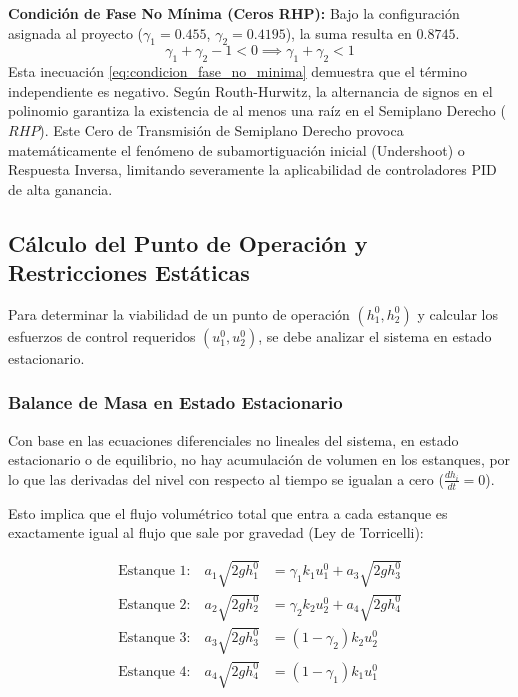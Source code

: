 \textbf{Condición de Fase No Mínima (Ceros RHP):}
Bajo la configuración asignada al proyecto ($\gamma_1 = 0.455$, $\gamma_2 = 0.4195$), la suma resulta en $0.8745$.
\begin{equation}
\gamma_1 + \gamma_2 - 1 < 0 \implies \gamma_1 + \gamma_2 < 1
\label{eq:condicion_fase_no_minima}
\end{equation}
Esta inecuación \eqref{eq:condicion_fase_no_minima} demuestra que el término independiente es negativo. Según Routh-Hurwitz, la alternancia de signos en el polinomio garantiza la existencia de al menos una raíz en el Semiplano Derecho ($RHP$). Este Cero de Transmisión de Semiplano Derecho provoca matemáticamente el fenómeno de subamortiguación inicial (Undershoot) o Respuesta Inversa, limitando severamente la aplicabilidad de controladores PID de alta ganancia.
\clearpage
\subsection{Cálculo del Punto de Operación y Restricciones Estáticas}

Para determinar la viabilidad de un punto de operación $(h_1^0, h_2^0)$ y calcular los esfuerzos de control requeridos $(u_1^0, u_2^0)$, se debe analizar el sistema en estado estacionario. 

\subsubsection{Balance de Masa en Estado Estacionario}
Con base en las ecuaciones diferenciales no lineales del sistema, en estado estacionario o de equilibrio, no hay acumulación de volumen en los estanques, por lo que las derivadas del nivel con respecto al tiempo se igualan a cero ($\frac{dh_i}{dt} = 0$). 

Esto implica que el flujo volumétrico total que entra a cada estanque es exactamente igual al flujo que sale por gravedad (Ley de Torricelli):

\begin{align}
\text{Estanque 1:} \quad a_1 \sqrt{2g h_1^0} &= \gamma_1 k_1 u_1^0 + a_3 \sqrt{2g h_3^0} \label{eq:estatico_1} \\
\text{Estanque 2:} \quad a_2 \sqrt{2g h_2^0} &= \gamma_2 k_2 u_2^0 + a_4 \sqrt{2g h_4^0} \label{eq:estatico_2} \\
\text{Estanque 3:} \quad a_3 \sqrt{2g h_3^0} &= (1-\gamma_2) k_2 u_2^0 \label{eq:estatico_3} \\
\text{Estanque 4:} \quad a_4 \sqrt{2g h_4^0} &= (1-\gamma_1) k_1 u_1^0 \label{eq:estatico_4}
\end{align}

